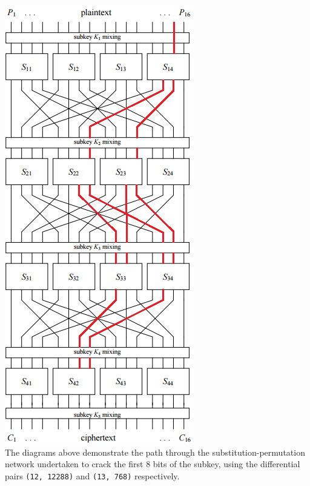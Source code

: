 \documentclass[british,11pt,a4paper]{article}
\begin{document}
\begin{appendices}
  \includegraphics{13,768}
  \\ 
  \hspace{1cm}
  The diagrams above demonstrate the path through the substitution-permutation network undertaken to crack the first 8 bits of the subkey, using the differential pairs \lstinline{(12, 12288)} and \lstinline{(13, 768)} respectively.
  \clearpage
  

\end{appendices}
\end{document}
